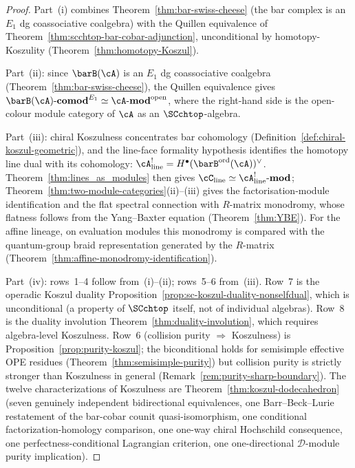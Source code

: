 \begin{proof}
Part~(i) combines Theorem~\ref{thm:bar-swiss-cheese} (the bar complex
is an $E_1$ dg coassociative coalgebra) with the Quillen equivalence of
Theorem~\ref{thm:scchtop-bar-cobar-adjunction}, unconditional by
homotopy-Koszulity (Theorem~\ref{thm:homotopy-Koszul}).

Part~(ii): since $\barB(\cA)$ is an $E_1$ dg coassociative coalgebra
(Theorem~\ref{thm:bar-swiss-cheese}), the Quillen equivalence gives
$\barB(\cA)\text{-}\mathbf{comod}^{E_1}
\simeq \cA\text{-}\mathbf{mod}^{\mathrm{open}}$,
where the right-hand side is the open-colour module category of $\cA$
as an $\SCchtop$-algebra.

Part~(iii): chiral Koszulness concentrates bar cohomology
(Definition~\ref{def:chiral-koszul-geometric}), and the line-face
formality hypothesis identifies the homotopy line dual with its
cohomology:
$\cA^!_{\mathrm{line}} = H^\bullet(\barB^{\mathrm{ord}}(\cA))^\vee$.
Theorem~\ref{thm:lines_as_modules} then gives
$\cC_{\mathrm{line}} \simeq \cA^!_{\mathrm{line}}\text{-}\mathbf{mod}$;
Theorem~\ref{thm:two-module-categories}(ii)--(iii) gives the
factorisation-module identification and the flat spectral connection
with $R$-matrix monodromy, whose flatness follows from the
Yang--Baxter equation (Theorem~\ref{thm:YBE}).
For the affine lineage, on evaluation modules this monodromy
is compared with the quantum-group braid representation generated by the
$R$-matrix \textup{(}Theorem~\textup{\ref{thm:affine-monodromy-identification}}\textup{)}.

Part~(iv): rows~1--4 follow from~(i)--(ii); rows~5--6
from~(iii). Row~7 is the operadic Koszul duality
Proposition~\ref{prop:sc-koszul-duality-nonselfdual}, which is unconditional
(a property of $\SCchtop$ itself, not of individual algebras).
Row~8 is the duality involution
Theorem~\ref{thm:duality-involution}, which requires
algebra-level Koszulness.
Row~6 (collision purity $\Rightarrow$ Koszulness) is
Proposition~\ref{prop:purity-koszul}; the biconditional holds for
semisimple effective OPE residues
(Theorem~\ref{thm:semisimple-purity}) but collision purity is
strictly stronger than Koszulness in general
(Remark~\ref{rem:purity-sharp-boundary}).
The twelve characterizations of Koszulness are
Theorem~\ref{thm:koszul-dodecahedron} (seven genuinely independent
bidirectional equivalences, one Barr--Beck--Lurie restatement of
the bar-cobar counit quasi-isomorphism, one conditional
factorization-homology comparison, one one-way chiral Hochschild
consequence, one perfectness-conditional Lagrangian criterion, one
one-directional $\mathcal{D}$-module purity implication).
\end{proof}

